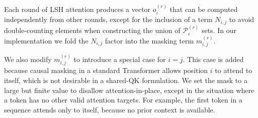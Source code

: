 \documentclass{article} \usepackage{iclr2020_conference,times}
\def\pair{\mathcal{P}}
\begin{document}
Each round of LSH attention produces a vector $o^{(r)}_i$ that can be computed independently from other rounds, except for the inclusion of a term $N_{i,j}$ to avoid double-counting elements when constructing the union of $\pair^{(r)}_i$ sets. In our implementation we fold the $N_{i,j}$ factor into the masking term $m^{(r)}_{i,j}$.

We also modify $m^{(r)}_{i,j}$ to introduce a special case for $i = j$.
This case is added because causal masking in a standard Transformer allows position $i$ to attend to itself, which is not desirable in a shared-QK formulation. We set the mask to a large but finite value to disallow attention-in-place, except in the situation where a token has no other valid attention targets. For example, the first token in a sequence attends only to itself, because no prior context is available.
\end{document}

